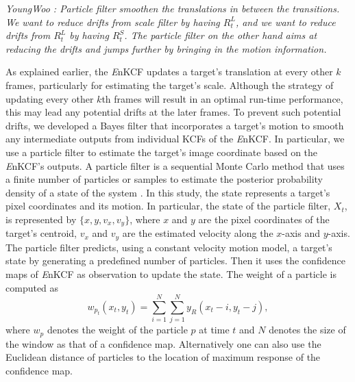 \documentclass[10pt,twocolumn,letterpaper]{article}
\begin{document}
{\it YoungWoo : Particle filter smoothen the translations in between the
transitions. We want to reduce drifts from scale filter by having $R_{t}^{L}$, and
we want to reduce drifts from $R_{t}^{L}$ by having $R_{t}^{S}$. The particle filter
on the other hand aims at reducing the drifts and jumps further by bringing in the 
motion information.}
  
As explained earlier, the {\it E}nKCF updates a target's translation at
every other $k$ frames, particularly for estimating the target's
scale. Although the strategy of updating every other $k$th frames will
result in an optimal run-time performance, this may lead any potential
drifts at the later frames. To prevent such potential drifts, we
developed a Bayes filter that incorporates a target's motion to smooth
any intermediate outputs from individual KCFs of the {\it E}nKCF. In
particular, we use a particle filter to estimate the target's image
coordinate based on the {\it E}nKCF's outputs. A particle filter is a
sequential Monte Carlo method that uses a finite number of particles
or samples to estimate the posterior probability density of a state of
the system \cite{thrun2005probabilistic}. In this study, the state
represents a target's pixel coordinates and its motion. In particular,
the state of the particle filter, $X_t$, is represented by $\lbrace x,
y, v_{x}, v_{y} \rbrace$, where $x$ and $y$ are the pixel coordinates
of the target's centroid, $v_x$ and $v_y$ are the estimated velocity
along the $x$-axis and $y$-axis. The particle filter predicts, using a
constant velocity motion model, a target's state by generating a
predefined number of particles. Then it uses the confidence maps of 
{\it E}nKCF as observation to update the state. The weight of a particle is computed as
\begin{equation}
w_{p_{t}}(x_{t},y_{t}) = \sum_{i=1}^{N}\sum_{j=1}^{N} y_{R}(x_{t}-i,y_{t}-j), 
\end{equation}
where $w_{p}$ denotes the weight of the particle $p$ at time $t$ and $N$ denotes the
size of the window as that of a confidence map. Alternatively one can
also use the Euclidean distance of particles to the location of
maximum response of the confidence map.

\end{document}
